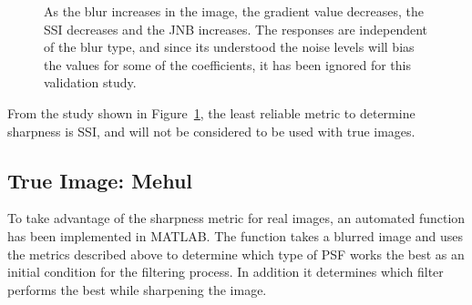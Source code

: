 \begin{figure}
        \caption{As the blur increases in the image, the gradient value decreases, the SSI decreases and the JNB increases. The responses are independent of the blur type, and since its understood the noise levels will bias the values for some of the  coefficients, it has been ignored for this validation study.} \label{fig:train_metrics}
\end{figure}

From the study shown in Figure~\ref{fig:train_metrics}, the least reliable metric to determine sharpness is SSI, and will not be considered to be used with true images.

\subsection{True Image: Mehul}
To take advantage of the sharpness metric for real images, an automated function has been implemented in MATLAB. The function takes a blurred image and uses the metrics described above to determine which type of PSF works the best as an initial condition for the filtering process. In addition it determines which filter performs the best while sharpening the image.


